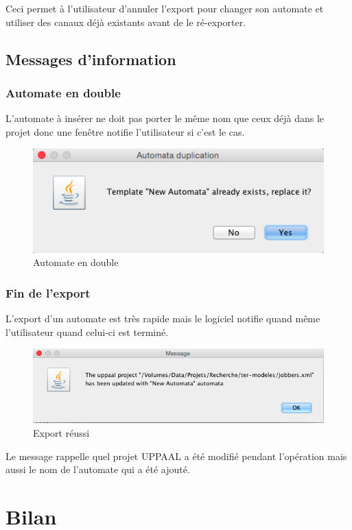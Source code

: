 \documentclass[12pt,a4paper]{report}
\begin{document}
Ceci permet à l'utilisateur d'annuler l'export pour changer son automate et utiliser 
des canaux déjà existants avant de le ré-exporter.

\subsection{Messages d'information}
\subsubsection*{Automate en double}
L'automate à insérer ne doit pas porter le même nom que ceux déjà dans le projet donc
une fenêtre notifie l'utilisateur si c'est le cas.

\begin{figure}[h]
  \centering
  \includegraphics[scale=0.6]{ressources/gui/exists.png}
  \caption{Automate en double}
\end{figure}

\subsubsection*{Fin de l'export}
L'export d'un automate est très rapide mais le logiciel notifie quand même 
l'utilisateur quand celui-ci est terminé. 

\begin{figure}[h]
  \centering
  \includegraphics[scale=0.6]{ressources/gui/success.png}
  \caption{Export réussi}
\end{figure}

Le message rappelle quel projet UPPAAL a été modifié pendant l'opération mais 
aussi le nom de l'automate qui a été ajouté.

\section{Bilan}
\end{document}
